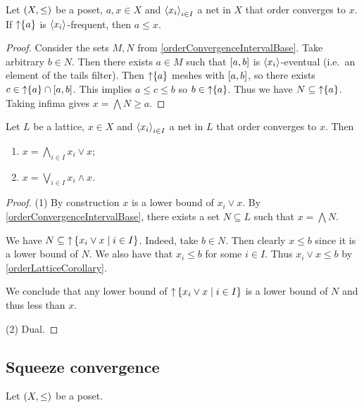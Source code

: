 \begin{lemma}
Let $\sSet{X,\leq}$ be a poset, $a,x\in X$ and $\left\langle x_i \right\rangle_{i\in I}$ a net in $X$ that order converges to $x$. If $\operatorname{\uparrow}\{a\}$ is $\left\langle x_i \right\rangle$-frequent, then $a\leq x$.
\end{lemma}
\begin{proof}
Consider the sets $M,N$ from \ref{orderConvergenceIntervalBase}. Take arbitrary $b\in N$. Then there exists $a\in M$ such that $\interval{a,b}$ is $\left\langle x_i \right\rangle$-eventual (i.e.\ an element of the tails filter). Then $\operatorname{\uparrow}\{a\}$ meshes with $\interval{a,b}$, so there exists $c\in \upset\{a\}\cap \interval{a,b}$. This implies $a\leq c\leq b$ so $b\in \operatorname{\uparrow}\{a\}$. Thus we have $N\subseteq \operatorname{\uparrow}\{a\}$. Taking infima gives $x = \bigwedge N \geq a$.
\end{proof}

\begin{lemma} \label{orderLimitMeetJoin}
Let $L$ be a lattice, $x\in X$ and $\left\langle x_i \right\rangle_{i\in I}$ a net in $L$ that order converges to $x$. Then
\begin{enumerate}
\item $x = \bigwedge_{i\in I}x_i \vee x$;
\item $x = \bigvee_{i\in I}x_i \wedge x$.
\end{enumerate}
\end{lemma}
\begin{proof}
(1) By construction $x$ is a lower bound of $x_i \vee x$. By \ref{orderConvergenceIntervalBase}, there exists a set $N\subseteq L$ such that $x = \bigwedge N$.

We have $N\subseteq \upset\setbuilder{x_i \vee x}{i\in I}$. Indeed, take $b\in N$. Then clearly $x\leq b$ since it is a lower bound of $N$. We also have that $x_i \leq b$ for some $i\in I$. Thus $x_i\vee x \leq b$ by \ref{orderLatticeCorollary}.

We conclude that any lower bound of $\upset\setbuilder{x_i \vee x}{i\in I}$ is a lower bound of $N$ and thus less than $x$.

(2) Dual.
\end{proof}

\subsection{Squeeze convergence}
\begin{definition}
Let $\sSet{X,\leq}$ be a poset.
\end{definition}



